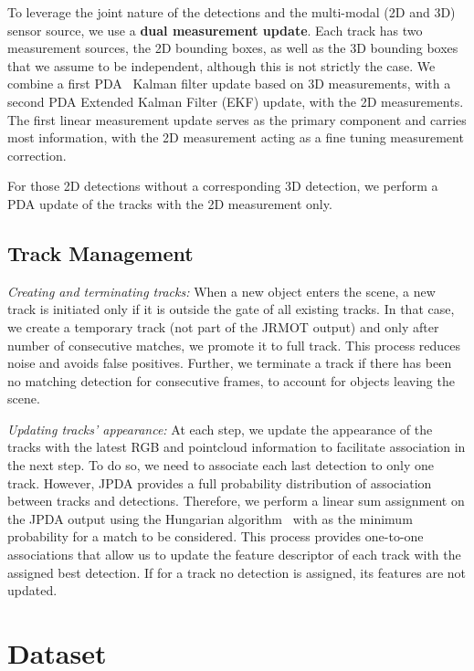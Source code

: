 \documentclass[letterpaper, 10 pt, conference]{ieeeconf}
\newcommand{\methodname}{{JRMOT}\xspace}
\begin{document}
To leverage the joint nature of the detections and the multi-modal (2D and 3D) sensor source, we use a \textbf{dual measurement update}. Each track has two measurement sources, the 2D bounding boxes, as well as the 3D bounding boxes that we assume to be independent, although this is not strictly the case. We combine a first PDA~\cite{bar2009probabilistic} Kalman filter update based on 3D measurements, with a second PDA Extended Kalman Filter (EKF) update, with the 2D measurements. The first linear measurement update serves as the primary component and carries most information, with the 2D measurement acting as a fine tuning measurement correction.

For those 2D detections without a corresponding 3D detection, we perform a PDA update of the tracks with the 2D measurement only.










\subsection{Track Management}
\label{ss:track_manage}

\textit{Creating and terminating tracks:} When a new object enters the scene, a new track is initiated only if it is outside the gate of all existing tracks. In that case, we create a temporary track (not part of the \methodname output) and only after  number of consecutive matches, we promote it to full track. This process reduces noise and avoids false positives. Further, we terminate a track if there has been no matching detection for  consecutive frames, to account for objects leaving the scene. 


\textit{Updating tracks' appearance:} At each step, we update the appearance of the tracks with the latest RGB and pointcloud information to facilitate association in the next step. To do so, we need to associate each last detection to only one track. However, JPDA provides a full probability distribution of association between tracks and detections. Therefore, we perform a linear sum assignment on the JPDA output using the Hungarian algorithm~\cite{Kuhn55thehungarian} with  as the minimum probability for a match to be considered. This process provides one-to-one associations that allow us to update the feature descriptor of each track with the assigned best detection. If for a track no detection is assigned, its features are not updated. \section{Dataset}
\end{document}
